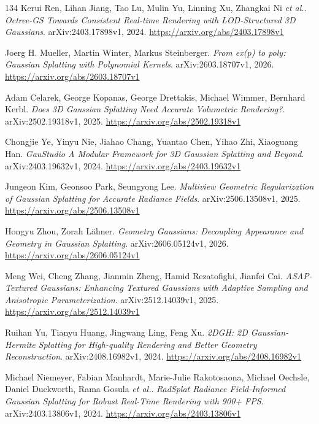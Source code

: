 \documentclass[11pt,a4paper]{article}
\begin{document}
\begin{thebibliography}{134}
Kerui Ren, Lihan Jiang, Tao Lu, Mulin Yu, Linning Xu, Zhangkai Ni \emph{et al.}.
\newblock \emph{Octree-GS Towards Consistent Real-time Rendering with LOD-Structured 3D Gaussians}.
\newblock arXiv:2403.17898v1, 2024.
\newblock \url{https://arxiv.org/abs/2403.17898v1}

Joerg H. Mueller, Martin Winter, Markus Steinberger.
\newblock \emph{From ex(p) to poly: Gaussian Splatting with Polynomial Kernels}.
\newblock arXiv:2603.18707v1, 2026.
\newblock \url{https://arxiv.org/abs/2603.18707v1}

Adam Celarek, George Kopanas, George Drettakis, Michael Wimmer, Bernhard Kerbl.
\newblock \emph{Does 3D Gaussian Splatting Need Accurate Volumetric Rendering?}.
\newblock arXiv:2502.19318v1, 2025.
\newblock \url{https://arxiv.org/abs/2502.19318v1}

Chongjie Ye, Yinyu Nie, Jiahao Chang, Yuantao Chen, Yihao Zhi, Xiaoguang Han.
\newblock \emph{GauStudio A Modular Framework for 3D Gaussian Splatting and Beyond}.
\newblock arXiv:2403.19632v1, 2024.
\newblock \url{https://arxiv.org/abs/2403.19632v1}

Jungeon Kim, Geonsoo Park, Seungyong Lee.
\newblock \emph{Multiview Geometric Regularization of Gaussian Splatting for Accurate Radiance Fields}.
\newblock arXiv:2506.13508v1, 2025.
\newblock \url{https://arxiv.org/abs/2506.13508v1}

Hongyu Zhou, Zorah L\"{a}hner.
\newblock \emph{Geometry Gaussians: Decoupling Appearance and Geometry in Gaussian Splatting}.
\newblock arXiv:2606.05124v1, 2026.
\newblock \url{https://arxiv.org/abs/2606.05124v1}

Meng Wei, Cheng Zhang, Jianmin Zheng, Hamid Rezatofighi, Jianfei Cai.
\newblock \emph{ASAP-Textured Gaussians: Enhancing Textured Gaussians with Adaptive Sampling and Anisotropic Parameterization}.
\newblock arXiv:2512.14039v1, 2025.
\newblock \url{https://arxiv.org/abs/2512.14039v1}

Ruihan Yu, Tianyu Huang, Jingwang Ling, Feng Xu.
\newblock \emph{2DGH: 2D Gaussian-Hermite Splatting for High-quality Rendering and Better Geometry Reconstruction}.
\newblock arXiv:2408.16982v1, 2024.
\newblock \url{https://arxiv.org/abs/2408.16982v1}

Michael Niemeyer, Fabian Manhardt, Marie-Julie Rakotosaona, Michael Oechsle, Daniel Duckworth, Rama Gosula \emph{et al.}.
\newblock \emph{RadSplat Radiance Field-Informed Gaussian Splatting for Robust Real-Time Rendering with 900+ FPS}.
\newblock arXiv:2403.13806v1, 2024.
\newblock \url{https://arxiv.org/abs/2403.13806v1}


\end{thebibliography}
\end{document}
